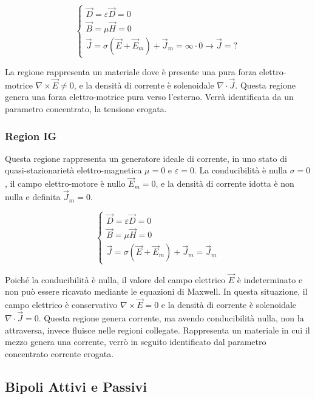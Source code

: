 \documentclass{article}
\numberwithin{equation}{subsection}
\begin{document}
\begin{equation*}
    \begin{cases}
        \vec{D}=\varepsilon\vec{D}=0\\
        \vec{B}=\mu\vec{H}=0\\
        \vec{J}=\sigma(\vec{E}+\vec{E}_m)+\vec{J}_m=\infty\cdot0\to\vec{J}=?
    \end{cases}
\end{equation*}

La regione rappresenta un materiale dove è presente una pura forza elettro-motrice $\nabla\times\vec{E}\neq0$, e la densità di corrente è solenoidale $\nabla\cdot\vec{J}$. 
Questa regione genera una forza elettro-motrice pura verso l'esterno. 
Verrà identificata da un parametro concentrato, la tensione erogata.

\subsubsection{Region IG}

Questa regione rappresenta un generatore ideale di corrente, in uno stato di quasi-stazionarietà elettro-magnetica $\mu=0$ e $\varepsilon=0$. La conducibilità è nulla $\sigma=0$, 
il campo elettro-motore è nullo $\vec{E}_m=0$, e la densità di corrente idotta è non nulla e definita $\vec{J}_m=0$. 

\begin{equation*}
    \begin{cases}
        \vec{D}=\varepsilon\vec{D}=0\\
        \vec{B}=\mu\vec{H}=0\\
        \vec{J}=\sigma(\vec{E}+\vec{E}_m)+\vec{J}_m=\vec{J}_m
    \end{cases}
\end{equation*}

Poiché la conducibilità è nulla, il valore del campo elettrico $\vec{E}$ è indeterminato e non può essere ricavato mediante le equazioni di Maxwell. In 
questa situazione, il campo elettrico è conservativo $\nabla\times\vec{E}=0$ e la densità di corrente è solenoidale $\nabla\cdot\vec{J}=0$. 
Questa regione genera corrente, ma avendo conducibilità nulla, non la attraversa, invece fluisce nelle regioni collegate. Rappresenta un materiale in cui il 
mezzo genera una corrente, verrò in seguito identificato dal parametro concentrato corrente erogata.

\subsection{Bipoli Attivi e Passivi}
\end{document}
